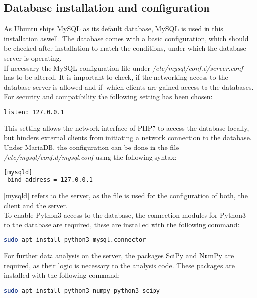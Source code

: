 \label{Database installation and configuration}
\subsection{Database installation and configuration}
As Ubuntu ships MySQL as its default database, MySQL is used in this installation aswell. The database comes with a basic configuration, which should be checked after installation
to match the conditions, under which the database server is operating.\\
If necessary the MySQL configuration file under \emph{/etc/mysql/conf.d/server.conf} has to be altered. It is important to check, if the networking access to the database server is allowed and 
if, which clients are gained access to the databases. For security and compatibility the following setting has been chosen:
\begin{lstlisting}[language=bash]
 listen: 127.0.0.1
\end{lstlisting}
This setting allows the network interface of PHP7
to access the database locally, but hinders external clients from initiating a network connection to the database.\\
Under MariaDB, the configuration can be done in the file \emph{/etc/mysql/conf.d/mysql.conf} using the following syntax:
\begin{lstlisting}[language=bash]
 [mysqld]
 bind-address = 127.0.0.1
\end{lstlisting}
[mysqld] refers to the server, as the file is used for the configuration of both, the client and the server.\\
To enable Python3 access to the database, the connection modules for Python3 to the database are required, these are installed with the following command:
\begin{lstlisting}[language=bash]
 sudo apt install python3-mysql.connector
\end{lstlisting}
For further data analysis on the server, the packages SciPy and NumPy are required, as their logic is necessary to the analysis code. These packages are installed with the following command:
\begin{lstlisting}[language=bash]
 sudo apt install python3-numpy python3-scipy
\end{lstlisting}


